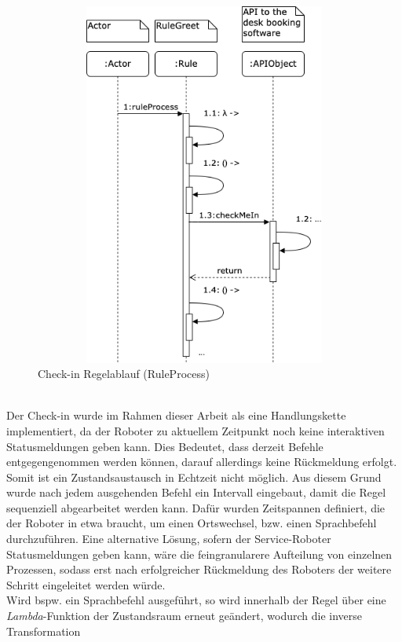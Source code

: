         \begin{figure}[hbt!]
            \centering
            \includegraphics[width=14cm,height=12cm,keepaspectratio]{images/sequence_rule_temi_greet.png}
            \caption{Check-in Regelablauf (RuleProcess)}
            \label{fig:sequenceRuleGreet}
        \end{figure}
        \\
        Der Check-in wurde im Rahmen dieser Arbeit als eine Handlungskette implementiert, da der Roboter zu aktuellem Zeitpunkt noch keine interaktiven Statusmeldungen geben kann. Dies 
        Bedeutet, dass derzeit Befehle entgegengenommen werden können, darauf allerdings keine Rückmeldung erfolgt. Somit ist ein Zustandsaustausch in Echtzeit nicht möglich. 
        Aus diesem Grund wurde nach jedem ausgehenden Befehl ein Intervall eingebaut, damit die Regel sequenziell abgearbeitet werden kann. Dafür wurden Zeitspannen definiert, die 
        der Roboter in etwa braucht, um einen Ortswechsel, bzw. einen Sprachbefehl durchzuführen. Eine alternative Lösung, sofern der Service-Roboter Statusmeldungen geben 
        kann, wäre die feingranularere Aufteilung von einzelnen Prozessen, sodass erst nach erfolgreicher Rückmeldung des Roboters der weitere Schritt eingeleitet werden würde.
        \\
        \linebreak
        Wird bspw. ein Sprachbefehl ausgeführt, so wird innerhalb der Regel über eine \textit{Lambda}-Funktion der Zustandsraum erneut geändert, wodurch die inverse Transformation 
